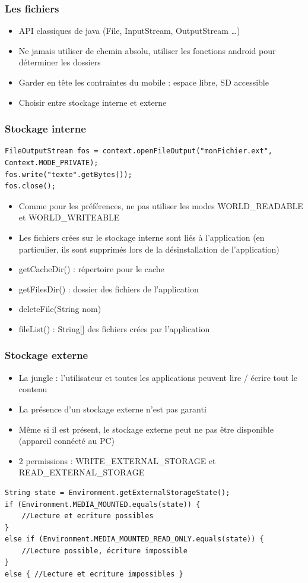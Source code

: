 \documentclass{beamer}
\begin{document}
\begin{frame}[fragile]
\frametitle{Les fichiers}
\begin{itemize}
    \item API classiques de java (File, InputStream, OutputStream \ldots)
    \item Ne jamais utiliser de chemin absolu, utiliser les fonctions android pour déterminer les dossiers
    \item Garder en tête les contraintes du mobile : espace libre, SD accessible
    \item Choisir entre stockage interne et externe
\end{itemize}
\end{frame}
\begin{frame}[fragile]
\frametitle{Stockage interne}
\begin{lstlisting}
FileOutputStream fos = context.openFileOutput("monFichier.ext", Context.MODE_PRIVATE);
fos.write("texte".getBytes());
fos.close();
\end{lstlisting}
\begin{itemize}
    \item Comme pour les préférences, ne pas utiliser les modes WORLD\_READABLE et WORLD\_WRITEABLE
    \item Les fichiers crées sur le stockage interne sont liés à l'application (en particulier, ils sont supprimés lors de la désinstallation de l'application)
\end{itemize}
\begin{itemize}
    \item getCacheDir() : répertoire pour le cache
    \item getFilesDir() : dossier des fichiers de l'application
    \item deleteFile(String nom)
    \item fileList() : String[] des fichiers crées par l'application
\end{itemize}
\end{frame}
\begin{frame}[fragile]
\frametitle{Stockage externe}
\begin{itemize}
    \item La jungle : l'utilisateur et toutes les applications peuvent lire / écrire tout le contenu
    \item La présence d'un stockage externe n'est pas garanti
    \item Même si il est présent, le stockage externe peut ne pas être
    disponible (appareil connécté au PC)
    \item 2 permissions : WRITE\_EXTERNAL\_STORAGE et READ\_EXTERNAL\_STORAGE
\end{itemize}
\begin{lstlisting}
String state = Environment.getExternalStorageState();
if (Environment.MEDIA_MOUNTED.equals(state)) {
    //Lecture et ecriture possibles
} 
else if (Environment.MEDIA_MOUNTED_READ_ONLY.equals(state)) {
    //Lecture possible, écriture impossible
} 
else { //Lecture et ecriture impossibles }
\end{lstlisting}
\end{frame}
\end{document}
